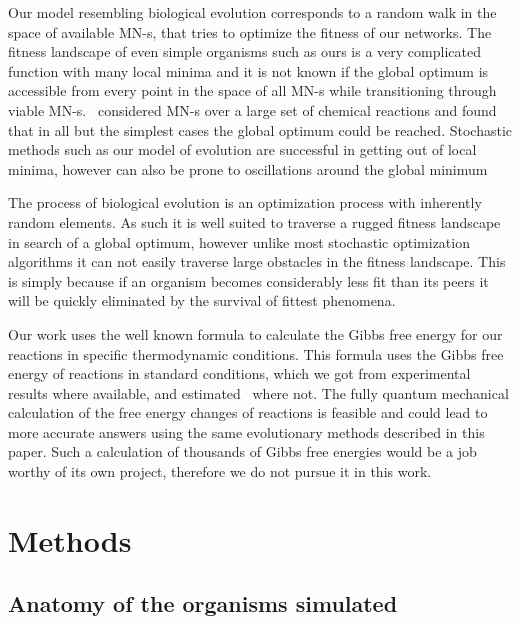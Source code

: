\documentclass[a4paper,12pt]{article}
\begin{document}
	Our model resembling biological evolution corresponds to a random walk in the space of available MN-s, that tries to optimize the fitness of our networks. The fitness landscape of even simple organisms such as ours is a very complicated function with many local minima and it is not known if the global optimum is accessible from every point in the space of all MN-s while transitioning through viable MN-s. \cite{historical}~considered MN-s over a large set of chemical reactions and found that in all but the simplest cases the global optimum could be reached. Stochastic methods such as our model of evolution are successful in getting out of local minima, however can also be prone to oscillations around the global minimum 

	The process of biological evolution is an optimization process with inherently random elements. As such it is well suited to traverse a rugged fitness landscape in search of a global optimum, however unlike most stochastic optimization algorithms it can not easily traverse large obstacles in the fitness landscape. This is simply because if an organism becomes considerably less fit than its peers it will be quickly eliminated by the survival of fittest phenomena.

	Our work uses the well known formula to calculate the Gibbs free energy for our reactions in specific thermodynamic conditions. This formula uses the Gibbs free energy of reactions in standard conditions, which we got from experimental results where available, and estimated \cite{BartekLower}~where not. The fully quantum mechanical calculation of the free energy changes of reactions is feasible and could lead to more accurate answers using the same evolutionary methods described in this paper. Such a calculation of thousands of Gibbs free energies would be a job worthy of its own project, therefore we do not pursue it in this work. 

	
\section{Methods}
\label{sec:methods}



	\subsection{Anatomy of the organisms simulated}
	\label{ssub:anatomy_of_the_oganisms_simulated}
\end{document}
